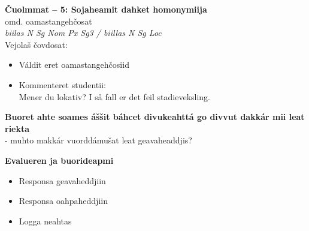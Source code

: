 \documentclass[landscape,norsk,11pt]{seminar}
\begin{document}
\begin{slide}
\newslide
\textbf{Čuolmmat -- 5: Sojaheamit dahket homonymiija} \\
omd. oamastangehčosat \\
\textit{biilas N Sg Nom Px Sg3 / biillas N Sg Loc} \\

Vejolaš čovdosat:
\begin{itemize}
\item Váldit eret oamastangehčosiid
\item Kommenteret studentii: \\
Mener du lokativ? I så fall er det feil stadieveksling.
\end{itemize}







\newslide
\textbf{Buoret ahte soames áššit báhcet divukeahttá go divvut dakkár mii leat riekta} \\
- muhto makkár vuorddámušat leat geavaheaddjis?

\newslide
\textbf{Evalueren ja buorideapmi}
\begin{itemize}
\item{Responsa geavaheddjiin}
\item{Responsa oahpaheddjiin}
\item{Logga neahtas}
\end{itemize}


\end{slide}
\end{document}

